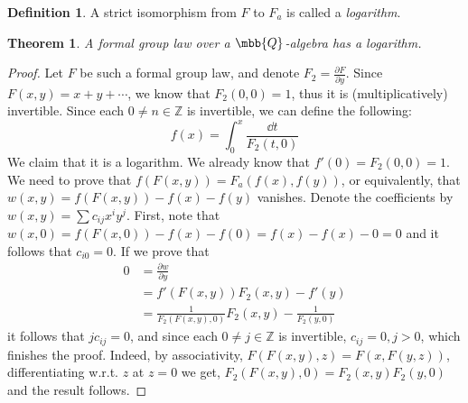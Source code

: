 \documentclass{article}
\newtheorem*{theorem*}{Theorem}
\theoremstyle{definition}
\newtheorem*{definition*}{Definition}
\theoremstyle{remark}
\begin{document}
	\begin{definition*}
		A strict isomorphism from $F$ to $F_a$ is called a \emph{logarithm}.
	\end{definition*}

	\begin{theorem*}
		A formal group law over a $\mbb{Q}$-algebra has a logarithm.
	\end{theorem*}

	\begin{proof}
		Let $F$ be such a formal group law, and denote $F_2 = \frac{\partial F}{\partial y}$.
		Since $F\left(x,y\right) = x+y+\cdots$, we know that $F_2\left(0,0\right) = 1$, thus it is (multiplicatively) invertible.
		Since each $0 \neq n \in \mathbb{Z}$ is invertible, we can define the following:
		$$ f\left(x\right) = \int_0^x \frac{\dd{t}}{F_2\left(t,0\right)} $$
		We claim that it is a logarithm.
		We already know that $f'\left(0\right) = F_2\left(0,0\right) = 1$.
		We need to prove that
		$f\left(F\left(x,y\right)\right) = F_a\left(f\left(x\right),f\left(y\right)\right)$,
		or equivalently, that
		$w\left(x,y\right) = f\left(F\left(x,y\right)\right) - f\left(x\right) - f\left(y\right)$ vanishes.
		Denote the coefficients by $w\left(x,y\right) = \sum c_{ij} x^i y^j$.
		First, note that
		$
			w\left(x,0\right)
			= f\left(F\left(x,0\right)\right) - f\left(x\right) - f\left(0\right)
			= f\left(x\right) - f\left(x\right) - 0
			= 0
		$
		and it follows that $c_{i0} = 0$.
		If we prove that
		\begin{align*}
			0
			&= \frac{\partial w}{\partial y}\\
			&= f'\left(F\left(x,y\right)\right) F_2\left(x,y\right) - f'\left(y\right)\\
			&= \frac{1}{F_2\left(F\left(x,y\right),0\right)} F_2\left(x,y\right) - \frac{1}{F_2\left(y,0\right)}
		\end{align*}
		it follows that $j c_{ij} = 0$, and since each $0 \neq j \in \mathbb{Z}$ is invertible, $c_{ij} = 0, j > 0$, which finishes the proof.
		Indeed, by associativity,
		$F\left(F\left(x,y\right),z\right)=F\left(x,F\left(y,z\right)\right)$, differentiating w.r.t. $z$ at $z=0$ we get,
		$
			F_2\left(F\left(x,y\right),0\right)
			= F_2\left(x,y\right) F_2\left(y,0\right)
		$
		and the result follows.
	\end{proof}
\end{document}
